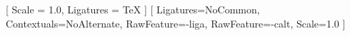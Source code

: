 \usepackage{fontspec}

\setmainfont{Iosevka Nerd Font}[
	Scale = 1.0,
	Ligatures = TeX
]
\setmonofont{Iosevka Nerd Font Mono}[
	Ligatures=NoCommon,    %
	Contextuals=NoAlternate,
	RawFeature=-liga,      %
	RawFeature=-calt,      %
	Scale=1.0
]

\usepackage{minted}

